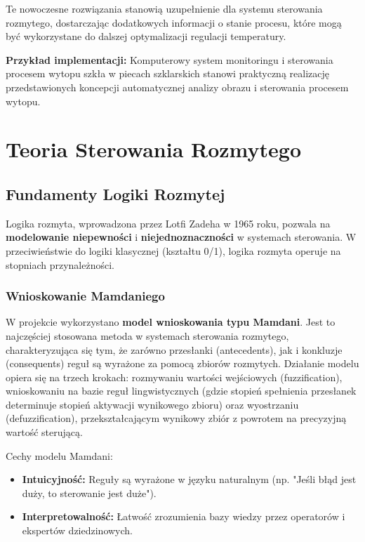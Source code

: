 \documentclass[12pt,a4paper]{article}
\begin{document}
Te nowoczesne rozwiązania stanowią uzupełnienie dla systemu sterowania rozmytego, dostarczając dodatkowych informacji o stanie procesu, które mogą być wykorzystane do dalszej optymalizacji regulacji temperatury.

\textbf{Przykład implementacji:} Komputerowy system monitoringu i sterowania procesem wytopu szkła w piecach szklarskich \cite{swiat-szkla-monitoring} stanowi praktyczną realizację przedstawionych koncepcji automatycznej analizy obrazu i sterowania procesem wytopu.

\section{Teoria Sterowania Rozmytego}

\subsection{Fundamenty Logiki Rozmytej}

Logika rozmyta, wprowadzona przez Lotfi Zadeha w 1965 roku, pozwala na \textbf{modelowanie niepewności} i \textbf{niejednoznaczności} w systemach sterowania. W przeciwieństwie do logiki klasycznej (kształtu 0/1), logika rozmyta operuje na stopniach przynależności.

\subsubsection{Wnioskowanie Mamdaniego}
W projekcie wykorzystano \textbf{model wnioskowania typu Mamdani}. Jest to najczęściej stosowana metoda w systemach sterowania rozmytego, charakteryzująca się tym, że zarówno przesłanki (antecedents), jak i konkluzje (consequents) reguł są wyrażone za pomocą zbiorów rozmytych. Działanie modelu opiera się na trzech krokach: rozmywaniu wartości wejściowych (fuzzification), wnioskowaniu na bazie reguł lingwistycznych (gdzie stopień spełnienia przesłanek determinuje stopień aktywacji wynikowego zbioru) oraz wyostrzaniu (defuzzification), przekształcającym wynikowy zbiór z powrotem na precyzyjną wartość sterującą. 

Cechy modelu Mamdani:
\begin{itemize}
    \item \textbf{Intuicyjność:} Reguły są wyrażone w języku naturalnym (np. "Jeśli błąd jest duży, to sterowanie jest duże").
    \item \textbf{Interpretowalność:} Łatwość zrozumienia bazy wiedzy przez operatorów i ekspertów dziedzinowych.
\end{itemize}
\end{document}
